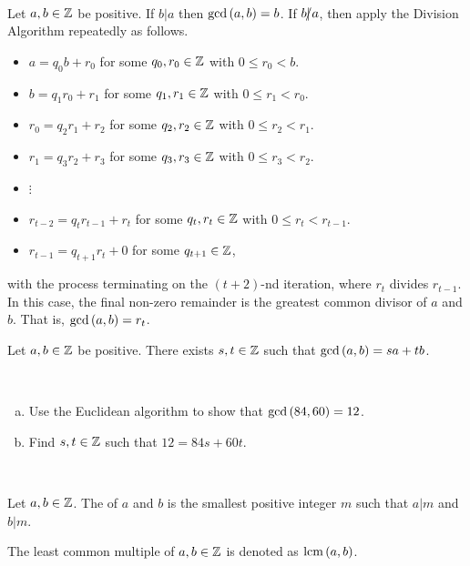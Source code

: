 \documentclass[11pt,fleqn,dvipsnames,usenames]{article}
\begin{document}
\begin{example*}~
\vspace{1cm}

\end{example*}
%
\begin{theorem*}
Let $a,b\in\mathbb{Z}$ be positive.  If $b|a$ then $\text{gcd}\left(a,b\right) = b$.  If $b|\kern-0.9ex{/} a$, then apply the Division Algorithm repeatedly as follows.

\begin{itemize}[\ ]
\item $a = q_{0}b + r_{0}$ for some $q_{0},r_{0}\in\mathbb{Z}$ with $0 \leq r_{0} < b$.
\item $b = q_{1}r_{0} + r_{1}$ for some $q_{1},r_{1}\in\mathbb{Z}$ with $0 \leq r_{1} < r_{0}$.
\item $r_{0} = q_{2}r_{1} + r_{2}$ for some $q_{2},r_{2}\in\mathbb{Z}$ with $0 \leq r_{2} < r_{1}$.
\item $r_{1} = q_{3}r_{2} + r_{3}$ for some $q_{3},r_{3}\in\mathbb{Z}$ with $0 \leq r_{3} < r_{2}$.
\item {}$\vdots$
\item $r_{t-2} = q_{t}r_{t-1} + r_{t}$ for some $q_{t},r_{t}\in\mathbb{Z}$ with $0 \leq r_{t} < r_{t-1}$.
\item $r_{t-1} = q_{t+1}r_{t} + 0$ for some $q_{t+1}\in\mathbb{Z}$,
\end{itemize}
with the process terminating on the $(t+2)$-nd iteration, where $r_{t}$ divides $r_{t-1}$.  In this case, the final non-zero remainder is the greatest common divisor of $a$ and $b$.  That is, $\text{gcd}\left(a,b\right) = r_{t}$.
\end{theorem*}
%
\begin{corollary*}\label{bezout}
Let $a,b\in\mathbb{Z}$ be positive.  There exists $s,t\in\mathbb{Z}$ such that $\text{gcd}\left(a,b\right) = sa + tb$.
\end{corollary*}
%
\begin{example*}~
\begin{enumerate}[(a)]
\item Use the Euclidean algorithm to show that $\text{gcd}\left(84,60\right) = 12$.
\item Find $s,t\in\mathbb{Z}$ such that $12 = 84s + 60t$.
\end{enumerate}
\end{example*}
%
\begin{solution}~
\vspace{10cm}

\end{solution}
%
\begin{definition*}
Let $a,b\in\mathbb{Z}$.  The  of $a$ and $b$ is the smallest positive integer $m$ such that $a|m$ and $b|m$.
\end{definition*}
%
\notation The least common multiple of $a,b\in\mathbb{Z}$ is denoted as $\text{lcm}\left(a,b\right)$.
\vsp
\end{document}
